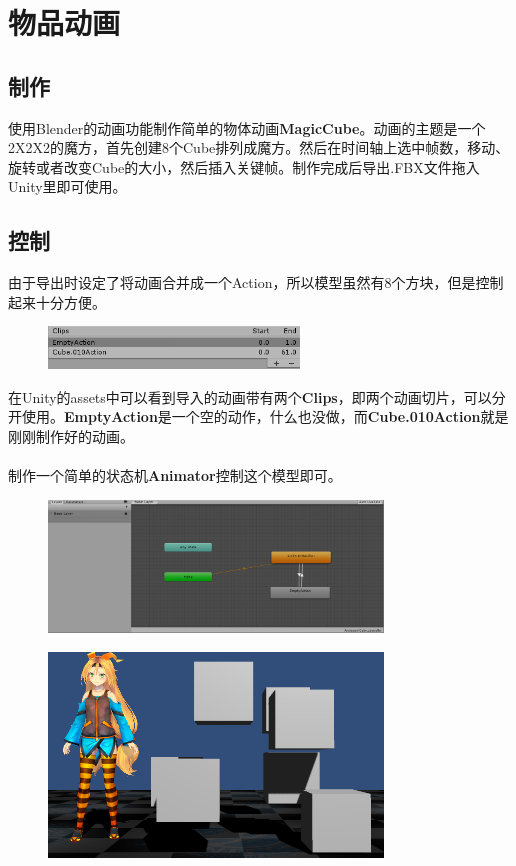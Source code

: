 \documentclass{article}
\begin{document}
\section{物品动画}
\subsection{制作}
使用Blender的动画功能制作简单的物体动画\textbf{MagicCube}。动画的主题是一个2X2X2的魔方，首先创建8个Cube排列成魔方。然后在时间轴上选中帧数，移动、旋转或者改变Cube的大小，然后插入关键帧。制作完成后导出.FBX文件拖入Unity里即可使用。
\subsection{控制}
由于导出时设定了将动画合并成一个Action，所以模型虽然有8个方块，但是控制起来十分方便。
\begin{figure}[H]
  \centering
  \includegraphics[width=18em]{clips.png}\\
  \caption{}\label{3-1}
\end{figure}
在Unity的assets中可以看到导入的动画带有两个\textbf{Clips}，即两个动画切片，可以分开使用。\textbf{EmptyAction}是一个空的动作，什么也没做，而\textbf{Cube.010Action}就是刚刚制作好的动画。
\paragraph{}
制作一个简单的状态机\textbf{Animator}控制这个模型即可。
\begin{figure}[H]
  \centering
  \includegraphics[width=24em]{cubeController.png}\\
  \caption{}\label{3-2}
  \includegraphics[width=24em]{result.png}\\
  \caption{}\label{3-3}
\end{figure}
\newpage
\end{document}
